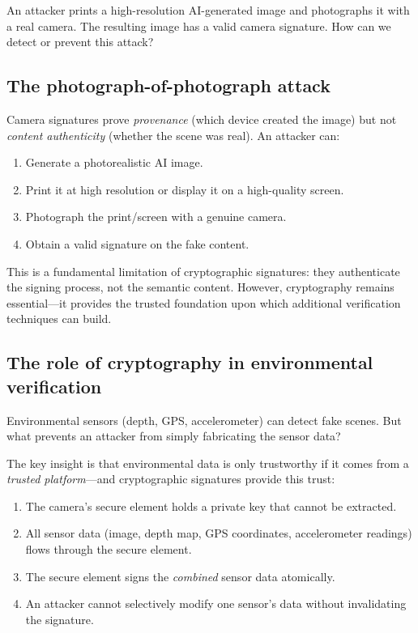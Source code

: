 \begin{exercise}
  An attacker prints a high-resolution AI-generated image and photographs it
  with a real camera.
  The resulting image has a valid camera signature.
  How can we detect or prevent this attack?
\end{exercise}

\subsection{The photograph-of-photograph attack}

Camera signatures prove \emph{provenance} (which device created the image) but
not \emph{content authenticity} (whether the scene was real).
An attacker can:
\begin{enumerate}
  \item Generate a photorealistic AI image.
  \item Print it at high resolution or display it on a high-quality screen.
  \item Photograph the print/screen with a genuine camera.
  \item Obtain a valid signature on the fake content.
\end{enumerate}

This is a fundamental limitation of cryptographic signatures: they authenticate
the signing process, not the semantic content.
However, cryptography remains essential---it provides the trusted foundation
upon which additional verification techniques can build.

\subsection{The role of cryptography in environmental verification}

\begin{exercise}
  Environmental sensors (depth, GPS, accelerometer) can detect fake scenes.
  But what prevents an attacker from simply fabricating the sensor data?
\end{exercise}

The key insight is that environmental data is only trustworthy if it comes from
a \emph{trusted platform}---and cryptographic signatures provide this trust:
\begin{enumerate}
  \item The camera's secure element holds a private key that cannot be
    extracted.
  \item All sensor data (image, depth map, GPS coordinates, accelerometer
    readings) flows through the secure element.
  \item The secure element signs the \emph{combined} sensor data atomically.
  \item An attacker cannot selectively modify one sensor's data without
    invalidating the signature.
\end{enumerate}

